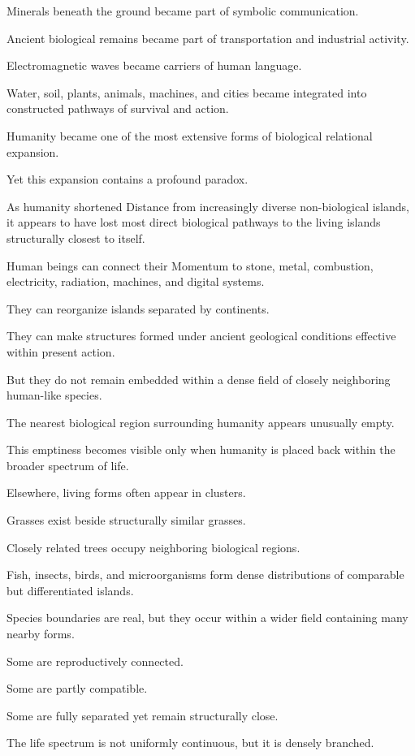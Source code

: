 Minerals beneath the ground became part of symbolic communication.

Ancient biological remains became part of transportation and industrial activity.

Electromagnetic waves became carriers of human language.

Water, soil, plants, animals, machines, and cities became integrated into constructed pathways of survival and action.

Humanity became one of the most extensive forms of biological relational expansion.

Yet this expansion contains a profound paradox.

As humanity shortened Distance from increasingly diverse non-biological islands, it appears to have lost most direct biological pathways to the living islands structurally closest to itself.

Human beings can connect their Momentum to stone, metal, combustion, electricity, radiation, machines, and digital systems.

They can reorganize islands separated by continents.

They can make structures formed under ancient geological conditions effective within present action.

But they do not remain embedded within a dense field of closely neighboring human-like species.

The nearest biological region surrounding humanity appears unusually empty.

This emptiness becomes visible only when humanity is placed back within the broader spectrum of life.

Elsewhere, living forms often appear in clusters.

Grasses exist beside structurally similar grasses.

Closely related trees occupy neighboring biological regions.

Fish, insects, birds, and microorganisms form dense distributions of comparable but differentiated islands.

Species boundaries are real, but they occur within a wider field containing many nearby forms.

Some are reproductively connected.

Some are partly compatible.

Some are fully separated yet remain structurally close.

The life spectrum is not uniformly continuous, but it is densely branched.

